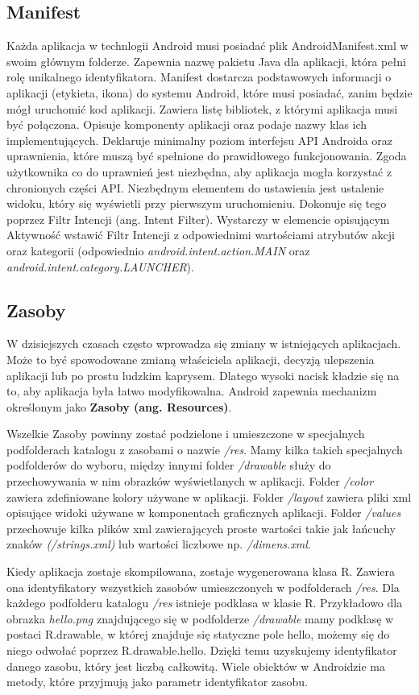 \subsection{Manifest}
Każda aplikacja w technlogii Android musi posiadać plik AndroidManifest.xml w swoim głównym folderze. Zapewnia nazwę pakietu Java dla aplikacji, która pełni rolę unikalnego identyfikatora. Manifest dostarcza podstawowych informacji o aplikacji (etykieta, ikona) do systemu Android, które musi posiadać, zanim będzie mógł uruchomić kod aplikacji.  Zawiera listę bibliotek, z którymi aplikacja musi być połączona. Opisuje komponenty aplikacji oraz podaje nazwy klas ich implementujących. Deklaruje minimalny poziom interfejsu API Androida oraz uprawnienia, które muszą być spełnione do prawidłowego funkcjonowania. Zgoda użytkownika co do uprawnień jest niezbędna, aby aplikacja mogła korzystać z chronionych części API. Niezbędnym elementem do ustawienia jest ustalenie widoku, który się wyświetli przy pierwszym uruchomieniu. Dokonuje się tego poprzez Filtr Intencji (ang. Intent Filter). Wystarczy w elemencie opisującym Aktywność wstawić Filtr Intencji z odpowiednimi wartościami atrybutów akcji oraz kategorii (odpowiednio \textit{android.intent.action.MAIN} oraz \textit{android.intent.category.LAUNCHER}).\cite{manifest}
\subsection{Zasoby}
W dzisiejszych czasach często wprowadza się zmiany w istniejących aplikacjach. Może to być spowodowane zmianą właściciela aplikacji, decyzją ulepszenia aplikacji lub po prostu ludzkim kaprysem. Dlatego wysoki nacisk kładzie się na to, aby aplikacja była łatwo modyfikowalna. Android zapewnia mechanizm określonym jako \textbf{Zasoby (ang. Resources)}.\par Wszelkie Zasoby powinny zostać podzielone i umieszczone w specjalnych podfolderach katalogu z zasobami o nazwie \textit{/res}. Mamy kilka takich specjalnych podfolderów do wyboru, między innymi folder \textit{/drawable} służy do przechowywania w nim obrazków wyświetlanych w aplikacji. Folder \textit{/color} zawiera zdefiniowane kolory używane w aplikacji. Folder \textit{/layout} zawiera pliki xml opisujące widoki używane w komponentach graficznych aplikacji. Folder \textit{/values} przechowuje kilka plików xml zawierających proste wartości takie jak łańcuchy znaków \textit{(/strings.xml)} lub wartości liczbowe np. \textit{/dimens.xml}.\cite{providing_resources}\par Kiedy aplikacja zostaje skompilowana, zostaje wygenerowana klasa R. Zawiera ona identyfikatory wszystkich zasobów umieszczonych w podfolderach \textit{/res}. Dla każdego podfolderu katalogu \textit{/res} istnieje podklasa w klasie R. Przykładowo dla obrazka \textit{hello.png} znajdującego się w podfolderze \textit{/drawable} mamy podklasę w postaci R.drawable, w której znajduje się statyczne pole hello, możemy się do niego odwołać poprzez R.drawable.hello. Dzięki temu uzyskujemy identyfikator danego zasobu, który jest liczbą całkowitą. Wiele obiektów w Androidzie ma metody, które przyjmują jako parametr identyfikator zasobu.\cite{accessing_resources}

